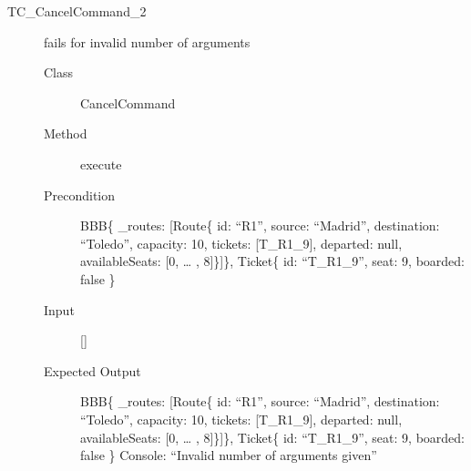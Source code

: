 \documentclass[11pt]{article}
\begin{document}
\begin{description}
\item[{TC\_CancelCommand\_2}] fails for invalid number of arguments
\begin{description}
\item[{Class}] CancelCommand
\item[{Method}] execute
\item[{Precondition}] BBB\{ \_routes: [Route\{ id: “R1”, source: “Madrid”, destination: “Toledo”, capacity: 10,  tickets: [T\_R1\_9], departed: null, availableSeats: [0, … , 8]\}]\}, Ticket\{ id: “T\_R1\_9”, seat: 9, boarded: false \}
\item[{Input}] []
\item[{Expected Output}] BBB\{ \_routes: [Route\{ id: “R1”, source: “Madrid”, destination: “Toledo”, capacity: 10,  tickets: [T\_R1\_9], departed: null, availableSeats: [0, … , 8]\}]\}, Ticket\{ id: “T\_R1\_9”, seat: 9, boarded: false \}
Console: “Invalid number of arguments given”
\end{description}
\end{description}
\end{document}
